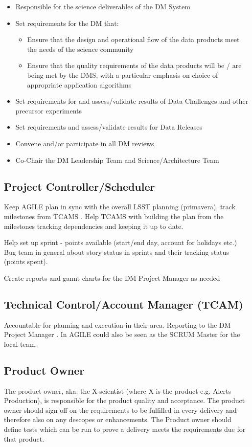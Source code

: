 \begin{itemize}
\item Responsible for the science deliverables of the DM System
\item Set requirements for the DM that:
\begin{itemize}
\item Ensure that the design and operational flow of the data products meet the needs of the science community
\item Ensure that the quality requirements of the data products will be / are being met by the DMS, with a particular emphasis on choice of appropriate application algorithms
\end{itemize}
\item Set requirements for and assess/validate results of Data Challenges and other precursor experiments
\item Set requirements and assess/validate results for Data Releases
\item Convene and/or participate in all DM reviews
\item Co-Chair the DM Leadership Team and Science/Architecture Team
\end{itemize}

\subsection{ Project Controller/Scheduler \label{role:pcon}}
Keep AGILE plan in sync with the overall LSST planning (primavera), track milestones from TCAMS . 
Help TCAMS with building the plan from the milestones tracking dependencies and keeping it up to date. 

Help set up sprint - points available (start/end day, account for holidays etc.) 
Bug team in general about story status in sprints and their tracking status (points spent).

Create reports and gannt charts for the DM Project Manager as needed 
\subsection{Technical Control/Account Manager (TCAM) \label{role:tcam} }
Accountable for planning and execution in their area. Reporting to the DM Project Manager . In AGILE could also be seen as the SCRUM Master for the local team.

\subsection{ Product Owner \label{role:prodo}}
The product owner, aka. the X scientist (where X is the product e.g. Alerts Production), is responsible for the product quality and acceptance. 
The product owner should sign off on the requirements to be fulfilled in every delivery and therefore also on any descopes or enhancements. 
The Product owner should define tests which can be run to prove a delivery meets the requirements due for that product. 


